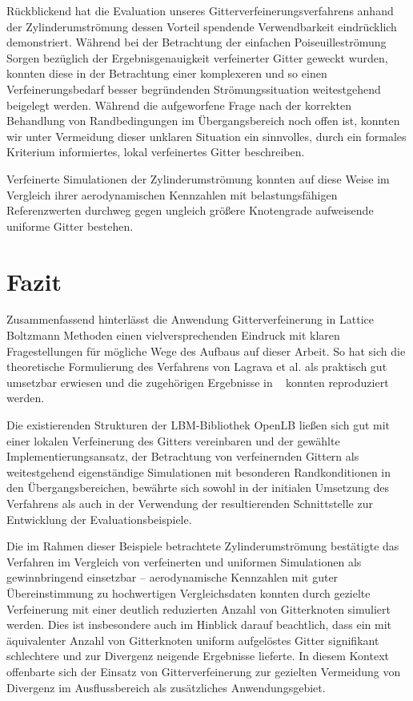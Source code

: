\bigskip
Rückblickend hat die Evaluation unseres Gitterverfeinerungsverfahrens anhand der Zylinderumströmung dessen Vorteil spendende Verwendbarkeit eindrücklich demonstriert. Während bei der Betrachtung der einfachen Poiseuilleströmung Sorgen bezüglich der Ergebnisgenauigkeit verfeinerter Gitter geweckt wurden, konnten diese in der Betrachtung einer komplexeren und so einen Verfeinerungsbedarf besser begründenden Strömungssituation weitestgehend beigelegt werden. Während die aufgeworfene Frage nach der korrekten Behandlung von Randbedingungen im Übergangsbereich noch offen ist, konnten wir unter Vermeidung dieser unklaren Situation ein sinnvolles, durch ein formales Kriterium informiertes, lokal verfeinertes Gitter beschreiben.

Verfeinerte Simulationen der Zylinderumströmung konnten auf diese Weise im Vergleich ihrer aerodynamischen Kennzahlen mit belastungsfähigen Referenzwerten \cite{SchaeferTurek96} durchweg gegen ungleich größere Knotengrade aufweisende uniforme Gitter bestehen.

\newpage
\section{Fazit}

Zusammenfassend hinterlässt die Anwendung Gitterverfeinerung in Lattice Boltzmann Methoden einen vielversprechenden Eindruck mit klaren Fragestellungen für mögliche Wege des Aufbaus auf dieser Arbeit. So hat sich die theoretische Formulierung des Verfahrens von Lagrava et al. als praktisch gut umsetzbar erwiesen und die zugehörigen Ergebnisse in ~\cite{Lagrava12} konnten reproduziert werden.

Die existierenden Strukturen der LBM-Bibliothek OpenLB ließen sich gut mit einer lokalen Verfeinerung des Gitters vereinbaren und der gewählte Implementierungsansatz, der Betrachtung von verfeinernden Gittern als weitestgehend eigenständige Simulationen mit besonderen Randkonditionen in den Übergangsbereichen, bewährte sich sowohl in der initialen Umsetzung des Verfahrens als auch in der Verwendung der resultierenden Schnittstelle zur Entwicklung der Evaluationsbeispiele.

Die im Rahmen dieser Beispiele betrachtete Zylinderumströmung bestätigte das Verfahren im Vergleich von verfeinerten und uniformen Simulationen als gewinnbringend einsetzbar -- aerodynamische Kennzahlen mit guter Übereinstimmung zu hochwertigen Vergleichsdaten \cite{SchaeferTurek96} konnten durch gezielte Verfeinerung mit einer deutlich reduzierten Anzahl von Gitterknoten simuliert werden. Dies ist insbesondere auch im Hinblick darauf beachtlich, dass ein mit äquivalenter Anzahl von Gitterknoten uniform aufgelöstes Gitter signifikant schlechtere und zur Divergenz neigende Ergebnisse lieferte. In diesem Kontext offenbarte sich der Einsatz von Gitterverfeinerung zur gezielten Vermeidung von Divergenz im Ausflussbereich als zusätzliches Anwendungsgebiet.

